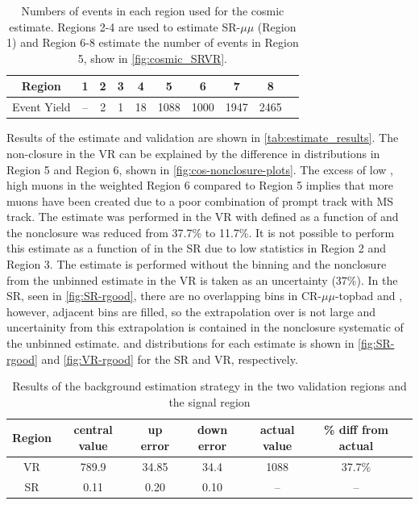 \begin{table}
\centering
\begin{tabular}{cccccccccc}
Region & 1    & 2 & 3 & 4 & 5 & 6 & 7 & 8\\
\hline
Event Yield & --  & 2 & 1 & 18 & 1088 & 1000 & 1947 & 2465 \\
\hline
\end{tabular}
\caption{Numbers of events in each region used for the cosmic estimate. Regions 2-4 are used to estimate SR-$\mu\mu$ (Region 1) and Region 6-8 estimate the number of events in Region 5, show in \autoref{fig:cosmic_SRVR}.}
\label{tab:estimate_counts}
\end{table}

Results of the estimate and validation are shown in \autoref{tab:estimate_results}. The non-closure in the VR can be explained by the difference in \absdz distributions in Region 5 and Region 6, shown in \autoref{fig:cos-nonclosure-plots}. The excess of low \absdz, high \chiCB muons in the weighted Region 6 compared to Region 5 implies that more muons have been created due to a poor combination of prompt track with MS track. The estimate was performed in the VR with \rgood  defined as a function of \absdz and the nonclosure was reduced from 37.7\% to 11.7\%. It is not possible to perform this estimate as a function of \absdz in the SR due to low statistics in Region 2 and Region 3. The estimate is performed without the \absdz binning and the nonclosure from the unbinned estimate in the VR is taken as an uncertainty (37\%). In the SR, seen in \autoref{fig:SR-rgood}, there are no overlapping \absdz bins in CR-$\mu\mu$-topbad and \rgood, however, adjacent bins are filled, so the extrapolation over \absdz is not large and uncertainity from this extrapolation is contained in the nonclosure systematic of the unbinned estimate. \rgood and \absdz distributions for each estimate is shown in \autoref{fig:SR-rgood} and \autoref{fig:VR-rgood} for the SR and VR, respectively.

\begin{table}
\centering{}
\begin{tabular}{ccccccc}
Region & central value & up error & down error & actual value & \% diff from actual \\
\hline
VR        & 789.9  & 34.85 & 34.4 & 1088 & 37.7\%  \\
SR        & 0.11 & 0.20  & 0.10  & --   & --   \\
\hline
\end{tabular}
\caption{Results of the background estimation strategy in the two validation regions and the signal region}
\label{tab:estimate_results}
\end{table}

